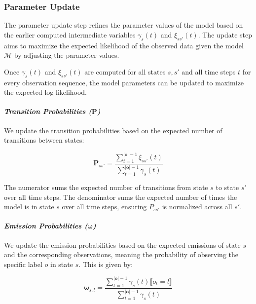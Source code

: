 \subsubsection{Parameter Update}
The parameter update step refines the parameter values of the model based on the earlier computed intermediate variables $\gamma_s(t)$ and $\xi_{ss'}(t)$.
The update step aims to maximize the expected likelihood of the observed data given the model $\mathcal{M}$ by adjusting the parameter values.

Once $\gamma_s(t)$ and $\xi_{ss'}(t)$ are computed for all states $s, s'$ and all time steps $t$ for every observation sequence, the model parameters can be updated to maximize the expected log-likelihood.

\paragraph*{\textit{Transition Probabilities ($\pmb{P}$)}}

We update the transition probabilities based on the expected number of transitions between states:


\begin{equation}
    \pmb{P}_{s s'} = \frac{\sum_{t = 1}^{|\mathbf{o}|-1} \xi_{ss'}(t)}{\sum_{t = 1}^{|\mathbf{o}|-1} \gamma_s(t)}
    \label{eq:transition-probabilities}
\end{equation}


The numerator sums the expected number of transitions from state $s$ to state $s'$ over all time steps.
The denominator sums the expected number of times the model is in state $s$ over all time steps, ensuring $P_{ss'}$ is normalized across all $s'$.

\paragraph*{\textit{Emission Probabilities ($\pmb{\omega}$)}}

We update the emission probabilities based on the expected emissions of state $s$ and the corresponding observations, meaning the probability of observing the specific label $o$ in state $s$.
This is given by:

\begin{equation}
    \pmb{\omega}_{s, l} = \frac{\sum_{t = 1}^{|\mathbf{o}|-1} \gamma_s(t) \lBrack o_t = l \rBrack}{\sum_{t = 1}^{|\mathbf{o}|-1} \gamma_s(t)}
    \label{eq:omega}
\end{equation}


